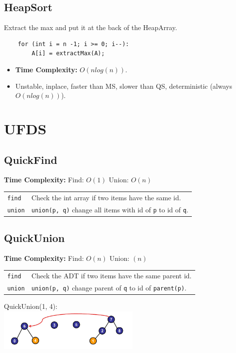 \documentclass[10pt,landscape,a4paper]{article}
\begin{document}
\begin{multicols*}{4}
\subsection{HeapSort}
Extract the max and put it at the back of the HeapArray.
\begin{lstlisting}
    for (int i = n -1; i >= 0; i--):
        A[i] = extractMax(A);
\end{lstlisting}
\begin{itemize}
    \item \textbf{Time Complexity:} $O(nlog(n))$.
    \item Unstable, inplace, faster than MS, slower than QS, deterministic (always $O(nlog(n))$).
\end{itemize}

\section{UFDS}

\subsection{QuickFind}
\textbf{Time Complexity:} Find: $O(1)$ Union: $O(n)$
\begin{tabular}{p{1cm} p{5.5cm}}
    \verb!find! &   Check the int array if two items have the same id. \\
    \verb!union!    &   \texttt{union(p, q)} change all items with id of \texttt{p} to id of \texttt{q}.
\end{tabular}

\subsection{QuickUnion}
\textbf{Time Complexity:} Find: $O(n)$ Union: $(n)$
\begin{tabular}{p{1cm} p{5.5cm}}
    \verb!find! &   Check the ADT if two items have the same parent id. \\
    \verb!union!    &   \texttt{union(p, q)} change parent of \texttt{q} to id of \texttt{parent(p)}.
\end{tabular}
QuickUnion(1, 4): \\
\includegraphics[width=7cm]{quickunion}


\end{multicols*}
\end{document}
